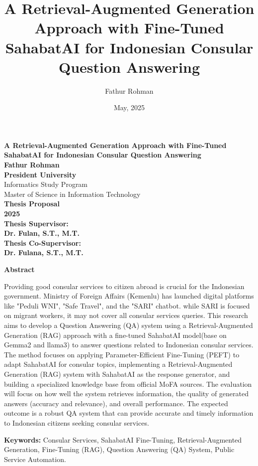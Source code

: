 \documentclass[12pt]{report}
\title{A Retrieval-Augmented Generation Approach with Fine-Tuned SahabatAI for Indonesian Consular Question Answering
}
\author{Fathur Rohman}
\date{May, 2025}
\begin{document}
\sloppy
\begin{titlepage}
  \begin{center}
    \vspace*{2cm} %

    {\LARGE \textbf{A Retrieval-Augmented Generation Approach with Fine-Tuned SahabatAI for Indonesian Consular Question Answering}} \\[1.5cm]

    \textbf{Fathur Rohman} \\[1.5cm]

    \vspace{5cm} %
    \textbf{President University} \\[0.5em]
    Informatics Study Program \\[0.5em]
    Master of Science in Information Technology \\[0.5em]
    \textbf{Thesis Proposal} \\[0.5em]
    \textbf{2025} \\[0.5em]
    \textbf{Thesis Supervisor:} \\[0.5em]
    \textbf{Dr. Fulan, S.T., M.T.} \\[0.5em]
    \textbf{Thesis Co-Supervisor:} \\[0.5em]    
    \textbf{Dr. Fulana, S.T., M.T.} \\[0.5em]
  \end{center}
\end{titlepage}

\begin{center}
  \textbf{Abstract}
\end{center}
\begin{spacing}{1.5} %

Providing good consular services to citizen abroad is crucial for the Indonesian government. Ministry of Foreign Affairs (Kemenlu) has launched digital platforms like "Peduli WNI", "Safe Travel", and the "SARI" chatbot.
while SARI is focused on migrant workers, it may not cover all consular services queries. 
This research aims to develop a Question Answering (QA) system using a Retrieval-Augmented Generation (RAG) approach with a fine-tuned SahabatAI model(base on Gemma2 and llama3) to answer questions related to Indonesian consular services. 
The method focuses on applying Parameter-Efficient Fine-Tuning (PEFT) to adapt SahabatAI for consular topics, implementing a Retrieval-Augmented Generation (RAG) system with SahabatAI as the response generator, and building a specialized knowledge base from official MoFA sources.
The evaluation will focus on how well the system retrieves information, the quality of generated answers (accuracy and relevance), and overall performance.
The expected outcome is a robust QA system that can provide accurate and timely information to Indonesian citizens seeking consular services.

\textbf{Keywords:} Consular Services, SahabatAI Fine-Tuning, Retrieval-Augmented Generation, Fine-Tuning (RAG), Question Answering (QA) System, Public Service Automation.
\end{spacing}
\end{document}
